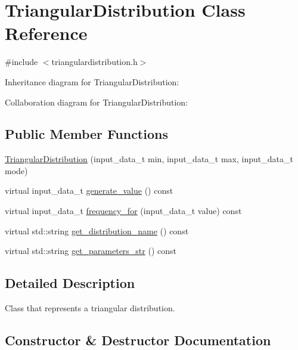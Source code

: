 \hypertarget{classTriangularDistribution}{}\section{Triangular\+Distribution Class Reference}
\label{classTriangularDistribution}


{\ttfamily \#include $<$triangulardistribution.\+h$>$}



Inheritance diagram for Triangular\+Distribution\+:


Collaboration diagram for Triangular\+Distribution\+:
\subsection*{Public Member Functions}
\begin{DoxyCompactItemize}
\item 
\hyperlink{classTriangularDistribution_aa58f55ecf1baa2060fb8e6307eb07f4a}{Triangular\+Distribution} (input\+\_\+data\+\_\+t min, input\+\_\+data\+\_\+t max, input\+\_\+data\+\_\+t mode)
\item 
virtual input\+\_\+data\+\_\+t \hyperlink{classTriangularDistribution_a2fd4ac4297a82fc223cdb0d3a81408cb}{generate\+\_\+value} () const
\item 
virtual input\+\_\+data\+\_\+t \hyperlink{classTriangularDistribution_a32419db37453948870df589d6c4abf3d}{frequency\+\_\+for} (input\+\_\+data\+\_\+t value) const
\item 
virtual std\+::string \hyperlink{classTriangularDistribution_ae9ceb04d07ea5f9dd9390ec62a7d0849}{get\+\_\+distribution\+\_\+name} () const
\item 
virtual std\+::string \hyperlink{classTriangularDistribution_af54199e88d5c537fe621ae177b86a9d6}{get\+\_\+parameters\+\_\+str} () const
\end{DoxyCompactItemize}


\subsection{Detailed Description}
Class that represents a triangular distribution. 

\subsection{Constructor \& Destructor Documentation}
\mbox{\label{classTriangularDistribution_aa58f55ecf1baa2060fb8e6307eb07f4a}} 
